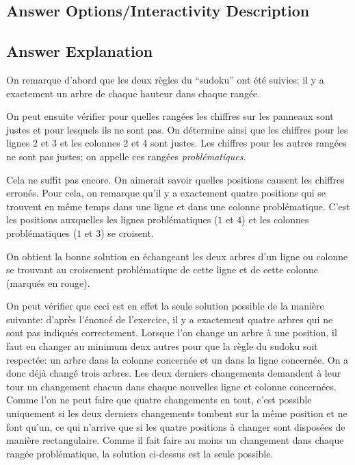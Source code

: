 \documentclass[a4paper,11pt]{report}
\newcommand{\taskGraphicsFolder}{..}
\begin{document}
\subsection*{Answer Options/Interactivity Description}



\endgroup

\subsection*{Answer Explanation}

On remarque d’abord que les deux règles du “sudoku” ont été suivies: il y a exactement un arbre de chaque hauteur dans chaque rangée.

On peut ensuite vérifier pour quelles rangées les chiffres sur les panneaux sont justes et pour lesquels ils ne sont pas. On détermine ainsi que les chiffres pour les lignes $2$ et $3$ et les colonnes $2$ et $4$ sont justes. Les chiffres pour les autres rangées ne sont pas justes; on appelle ces rangées \emph{problématiques}.

Cela ne suffit pas encore. On aimerait savoir quelles positions causent les chiffres erronés. Pour cela, on remarque qu’il y a exactement quatre positions qui se trouvent en même temps dans une ligne et dans une colonne problématique. C’est les positions auxquelles les lignes problématiques ($1$ et $4$) et les colonnes problématiques ($1$ et $3$) se croisent.

On obtient la bonne solution en échangeant les deux arbres d’un ligne ou colonne se trouvant au croisement problématique de cette ligne et de cette colonne (marqués en rouge).

{\centering%
\par}

On peut vérifier que ceci est en effet la seule solution possible de la manière suivante: d’après l’énoncé de l’exercice, il y a exactement quatre arbres qui ne sont pas indiqués correctement. Lorsque l’on change un arbre à une position, il faut en changer au minimum deux autres pour que la règle du sudoku soit respectée: un arbre dans la colonne concernée et un dans la ligne concernée. On a donc déjà changé trois arbres. Les deux derniers changements demandent à leur tour un changement chacun dans chaque nouvelles ligne et colonne concernées. Comme l’on ne peut faire que quatre changements en tout, c’est possible uniquement si les deux derniers changements tombent sur la même position et ne font qu’un, ce qui n’arrive que si les quatre positions à changer sont disposées de manière rectangulaire. Comme il fait faire au moins un changement dans chaque rangée problématique, la solution ci-dessus est la seule possible.
\end{document}
